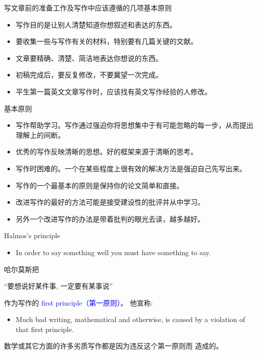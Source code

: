 \documentclass[10pt]{ctexbeamer}
\newcommand{\blue}[1]{\textcolor{blue}{#1}}
\begin{document}
\begin{frame}
	写文章前的准备工作及写作中应该遵循的几项基本原则
	\begin{itemize}
		\item  写作目的是让别人清楚知道你想叙述和表达的东西。
		\item 要收集一些与写作有关的材料，特别要有几篇关键的文献。
		\item 文章要精确、清楚、简洁地表达你想说的东西。
		\item 初稿完成后，要反复修改，不要冀望一次完成。
		\item 平生第一篇英文文章写作时，应该找有英文写作经验的人修改。
	\end{itemize}
\end{frame}

\begin{frame}{基本原则}

\begin{itemize}
	\item  写作帮助学习。写作通过强迫你将思想集中于有可能忽略的每一步，从而提出理解上的间断。
	\item 优秀的写作反映清晰的思想。好的框架来源于清晰的思考。
	\item  写作时困难的。一个在某些程度上很有效的解决方法是强迫自己先写出来。
	\item 写作的一个最基本的原则是保持你的论文简单和直接。
	\item 改进写作的最好的方法可能是接受建设性的批评并从中学习。
	\item 另外一个改进写作的办法是带着批判的眼光去读，越多越好。
\end{itemize}
\end{frame}

\begin{frame}{Halmos's principle}
\begin{itemize}
	\item  In order to say something well you must have something to say.
\end{itemize}

\pause
哈尔莫斯把
\begin{center}
“{要想说好某件事, 一定要有某事说}”
\end{center}

作为写作的 \blue{first principle（第一原则）}。
他宣称:

\begin{itemize}
    \item  Much bad writing, mathematical and otherwise, is caused by a violation of that first principle.
\end{itemize}

\pause

数学或其它方面的许多劣质写作都是因为违反这个第一原则而 造成的。



\end{frame}
\end{document}
